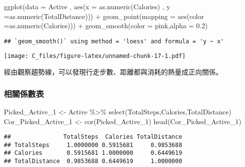 \documentclass[
]{article}
\newenvironment{Shaded}{\begin{snugshade}}{\end{snugshade}}
\newcommand{\AttributeTok}[1]{\textcolor[rgb]{0.77,0.63,0.00}{#1}}
\newcommand{\FloatTok}[1]{\textcolor[rgb]{0.00,0.00,0.81}{#1}}
\newcommand{\FunctionTok}[1]{\textcolor[rgb]{0.00,0.00,0.00}{#1}}
\newcommand{\NormalTok}[1]{#1}
\newcommand{\OtherTok}[1]{\textcolor[rgb]{0.56,0.35,0.01}{#1}}
\newcommand{\SpecialCharTok}[1]{\textcolor[rgb]{0.00,0.00,0.00}{#1}}
\newcommand{\StringTok}[1]{\textcolor[rgb]{0.31,0.60,0.02}{#1}}
\begin{document}
\begin{Shaded}
\begin{Highlighting}[]
\FunctionTok{ggplot}\NormalTok{(}\AttributeTok{data =}\NormalTok{ Active , }\FunctionTok{aes}\NormalTok{(}\AttributeTok{x =} \FunctionTok{as.numeric}\NormalTok{(Calories) , }\AttributeTok{y =}\FunctionTok{as.numeric}\NormalTok{(TotalDistance))) }\SpecialCharTok{+} 
                  \FunctionTok{geom\_point}\NormalTok{(}\AttributeTok{mapping =} \FunctionTok{aes}\NormalTok{(}\AttributeTok{color =}\FunctionTok{as.numeric}\NormalTok{(Calories))) }\SpecialCharTok{+}
                  \FunctionTok{geom\_smooth}\NormalTok{(}\AttributeTok{color =} \StringTok{\textquotesingle{}pink\textquotesingle{}}\NormalTok{,}\AttributeTok{alpha =} \FloatTok{0.2}\NormalTok{)}
\end{Highlighting}
\end{Shaded}

\begin{verbatim}
## `geom_smooth()` using method = 'loess' and formula = 'y ~ x'
\end{verbatim}

\texttt{[image: C\_files/figure-latex/unnamed-chunk-17-1.pdf]}

經由觀察趨勢線，可以發現行走步數、距離都與消耗的熱量成正向關係。

\hypertarget{ux76f8ux95dcux4fc2ux6578ux8868}{%
\subsubsection{相關係數表}\label{ux76f8ux95dcux4fc2ux6578ux8868}}

\begin{Shaded}
\begin{Highlighting}[]
\NormalTok{Picked\_Active\_1 }\OtherTok{\textless{}{-}}\NormalTok{ Active }\SpecialCharTok{\%\textgreater{}\%} 
  \FunctionTok{select}\NormalTok{(TotalSteps,Calories,TotalDistance)}
\NormalTok{Cor\_Picked\_Active\_1 }\OtherTok{\textless{}{-}} \FunctionTok{cor}\NormalTok{(Picked\_Active\_1)}
\FunctionTok{head}\NormalTok{(Cor\_Picked\_Active\_1)}
\end{Highlighting}
\end{Shaded}

\begin{verbatim}
##               TotalSteps  Calories TotalDistance
## TotalSteps     1.0000000 0.5915681     0.9853688
## Calories       0.5915681 1.0000000     0.6449619
## TotalDistance  0.9853688 0.6449619     1.0000000
\end{verbatim}
\end{document}

